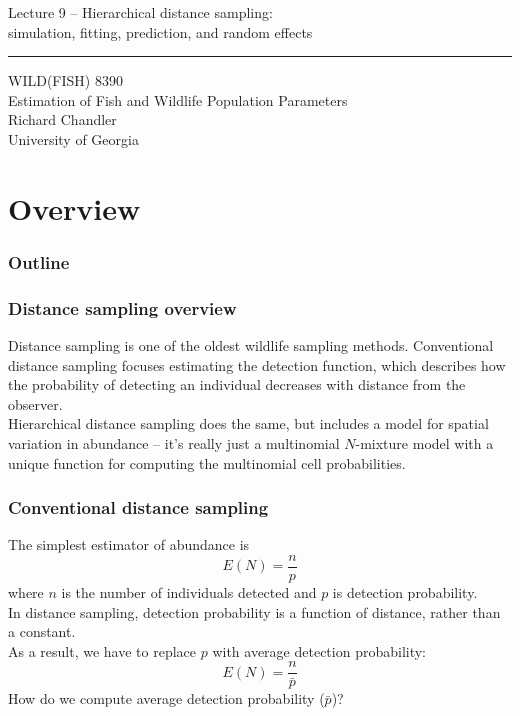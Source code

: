 \documentclass[color=usenames,dvipsnames]{beamer}\usepackage[]{graphicx}\usepackage[]{color}
\begin{document}
\begin{frame}[plain]
  \LARGE
  \centering
  {\LARGE Lecture 9 -- Hierarchical distance sampling: \\
    \Large simulation, fitting, prediction, and random effects} \\
  {\color{default} \rule{\textwidth}{0.1pt}}
  \vfill
  \large
  WILD(FISH) 8390 \\
  Estimation of Fish and Wildlife Population Parameters \\
  \vfill
  \large
  Richard Chandler \\
  University of Georgia \\
\end{frame}






\section{Overview}



\begin{frame}[plain]
  \frametitle{Outline}
  \Large
\end{frame}



\begin{frame}
  \frametitle{Distance sampling overview}
  Distance sampling is one of the oldest wildlife sampling methods.
  \pause
  \vfill
  \alert{Conventional} distance sampling focuses estimating the
  detection function, which describes how the probability of detecting
  an individual decreases with distance from the observer. \\
  \pause
  \vfill
  \alert{Hierarchical} distance sampling does the same, but includes a
  model for spatial variation in abundance -- it's really just a
  multinomial $N$-mixture model with a unique function for computing
  the multinomial cell probabilities.
\end{frame}



\begin{frame}
  \frametitle{Conventional distance sampling}
  The simplest estimator of abundance is
  \[
    E(N) = \frac{n}{p}
  \]
  where $n$ is the number of individuals detected and $p$ is detection
  probability. \\
  \pause
  \vfill
  In distance sampling, detection probability is a \alert{function} of
  distance, rather than a constant. \\ As a result, we have to replace
  $p$ with \alert{average} detection probability:
  \[
    E(N) = \frac{n}{\bar{p}}
  \]
  \pause
  \vfill
  How do we compute average detection probability ($\bar{p}$)?
\end{frame}
\end{document}
